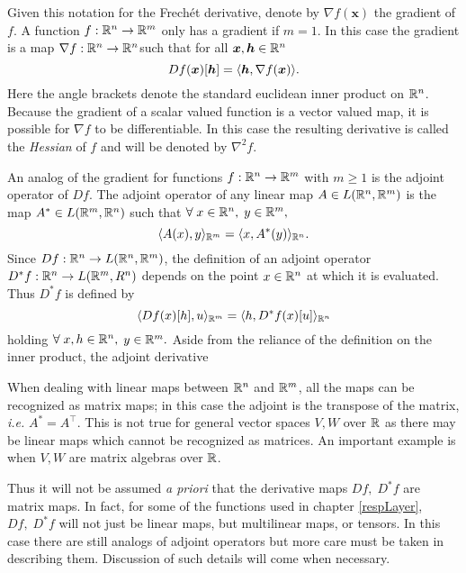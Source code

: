 Given this notation for the Frech\'et derivative, denote by \( \nabla f(\bm x) \) the gradient of \( f \). A function \( f:\mathbb R^n\rightarrow \mathbb R^m \) only has a gradient if \( m = 1 \). In this case the gradient is a map \( \nabla f:\mathbb R^n\rightarrow\mathbb R^n \)such that for all \( \bm x, \bm h \in \mathbb R^n \)
\begin{equation}\label{eqn:gradDef}
 Df(\bm x)[\bm h] = \langle\bm h, \nabla f(\bm x)\rangle.
\end{equation} 
Here the angle brackets denote the standard euclidean inner product on \( \mathbb R^n \).  Because the gradient of a scalar valued function is a vector valued map, it is possible for \( \nabla f \) to be differentiable. In this case the resulting derivative is called the \textit{Hessian} of \( f \) and will be denoted by \( \nabla^2 f. \) 

An analog of the gradient for functions \( f:\mathbb R^n\rightarrow\mathbb R^m \) with \( m\geq 1 \) is the adjoint operator of \( Df \). The adjoint operator of any linear map \( A\in L(\mathbb R^n,\mathbb R^m) \) is the map \( A^{\ast}\in L(\mathbb R^m,\mathbb R^n) \) such that \( \forall\; x\in\mathbb R^n,\) \(y\in\mathbb R^m, \) 
\[ \langle A(x),y\rangle_{\mathbb R^m} = \langle x,A^{\ast}(y)\rangle_{\mathbb R^n}. \]
Since \( Df:\mathbb R^n\rightarrow L(\mathbb R^n,\mathbb R^m) \), the definition of an adjoint operator \( D^{\ast}f:\mathbb R^n\rightarrow L(\mathbb R^m,R^n)\) depends on the point \( x\in\mathbb R^n \) at which it is evaluated.  Thus \( D^{\ast}f \) is defined by 
\begin{equation*}
\langle Df(x)[h],u\rangle_{\mathbb R^m} = \langle h,D^{\ast}f(x)[u]\rangle_{\mathbb R^n}
\end{equation*}
holding \( \forall\; x,h\in\mathbb R^n,\) \(y\in\mathbb R^m.\) Aside from the reliance of the definition on the inner product, the adjoint derivative 

When dealing with linear maps between \( \mathbb R^n \) and \( \mathbb R^m \), all the maps can be recognized as matrix maps; in this case the adjoint is the transpose of the matrix, \textit{i.e.} \( A^\ast = A^{\intercal} \). This is not true for general vector spaces \( V,W \) over \( \mathbb R \) as there may be linear maps which cannot be recognized as matrices. An important example is when \( V,W \) are matrix algebras over \( \mathbb R \).

Thus it will not be assumed \textit{a priori} that the derivative maps \( Df,\;D^{\ast}f \) are matrix maps.  In fact, for some of the functions used in chapter \ref{respLayer}, \( Df,\;D^{\ast}f \) will not just be linear maps, but multilinear maps, or tensors.  In this case there are still analogs of adjoint operators but more care must be taken in describing them. Discussion of such details will come when necessary.

